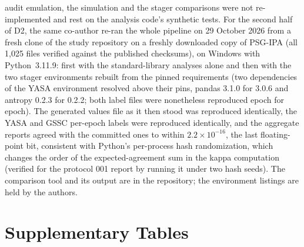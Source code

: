 \documentclass[11pt]{article}
\begin{document}
audit emulation, the simulation and the stager comparisons were not re-implemented and rest on the analysis code's
synthetic tests. For the second half of D2, the same co-author re-ran the whole pipeline on 29 October 2026 from a
fresh clone of the study repository on a freshly downloaded copy of PSG-IPA (all 1,025 files verified against the
published checksums), on Windows with Python~3.11.9: first with the standard-library analyses alone and then with the
two stager environments rebuilt from the pinned requirements (two dependencies of the YASA environment resolved above
their pins, pandas 3.1.0 for 3.0.6 and antropy 0.2.3 for 0.2.2; both label files were nonetheless reproduced epoch for
epoch). The generated values file as it then stood was reproduced identically,
the YASA and GSSC per-epoch labels were reproduced identically, and the aggregate reports agreed with the committed
ones to within $2.2\times10^{-16}$, the last floating-point bit, consistent with Python's per-process hash randomization, which changes the order of the expected-agreement sum in the kappa computation (verified for the
protocol 001 report by running it under two hash seeds). The comparison tool and its output are in the repository;
the environment listings are held by the authors.

\clearpage
\section*{Supplementary Tables}
\end{document}
